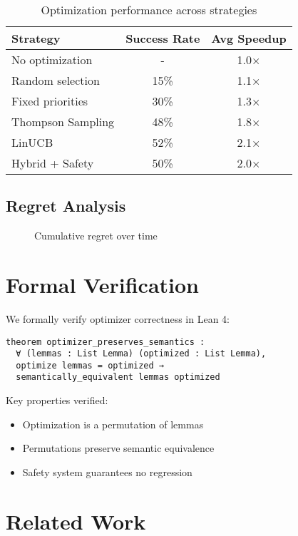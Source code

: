 \documentclass{article}
\theoremstyle{plain}
\theoremstyle{definition}
\begin{document}
\begin{table}[h]
\centering
\begin{tabular}{lcc}
\hline
Strategy & Success Rate & Avg Speedup \\
\hline
No optimization & - & 1.0× \\
Random selection & 15\% & 1.1× \\
Fixed priorities & 30\% & 1.3× \\
Thompson Sampling & 48\% & 1.8× \\
LinUCB & 52\% & 2.1× \\
Hybrid + Safety & 50\% & 2.0× \\
\hline
\end{tabular}
\caption{Optimization performance across strategies}
\end{table}

\subsection{Regret Analysis}

\begin{figure}[h]
\centering
\caption{Cumulative regret over time}
\end{figure}

\section{Formal Verification}

We formally verify optimizer correctness in Lean 4:

\begin{verbatim}
theorem optimizer_preserves_semantics :
  ∀ (lemmas : List Lemma) (optimized : List Lemma),
  optimize lemmas = optimized →
  semantically_equivalent lemmas optimized
\end{verbatim}

Key properties verified:
\begin{itemize}
\item Optimization is a permutation of lemmas
\item Permutations preserve semantic equivalence
\item Safety system guarantees no regression
\end{itemize}

\section{Related Work}
\end{document}
